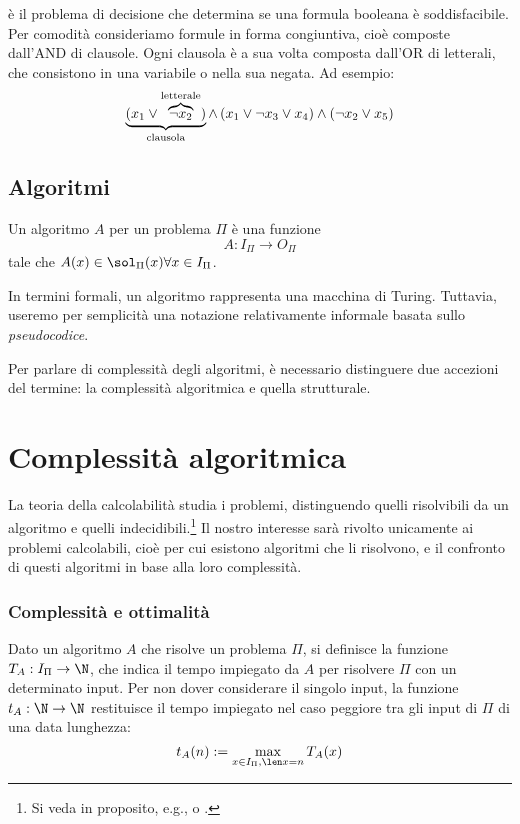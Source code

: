 \begin{examp}
	\Sat è il problema di decisione che determina se una formula booleana è soddisfacibile. Per comodità consideriamo formule in forma congiuntiva, cioè composte dall'AND di clausole. Ogni clausola è a sua volta composta dall'OR di letterali, che consistono in una variabile o nella sua negata. Ad esempio:
	\begin{equation*}
		\underbrace{(x_1\lor\overbrace{\lnot x_2}^{\text{letterale}})}_{\text{clausola}}\land\mkern 3mu (x_1\lor\lnot x_3\lor x_4)\land(\lnot x_2\lor x_5)
	\end{equation*}
\end{examp}



\subsection{Algoritmi}
Un algoritmo $A$ per un problema $\Pi$ è una funzione
\begin{equation*}
	A: I_{\Pi} \to O_{\Pi}
\end{equation*}
tale che $A(x)\in\sol_{\Pi}(x)\forall x\in I_\Pi$.

In termini formali, un algoritmo rappresenta una macchina di Turing.
Tuttavia, useremo per semplicità una notazione relativamente informale basata sullo \emph{pseudocodice}.

Per parlare di complessità degli algoritmi, è necessario distinguere due accezioni del termine: la complessità algoritmica e quella strutturale.



\section{Complessità algoritmica}
La teoria della calcolabilità studia i problemi, distinguendo quelli risolvibili da un algoritmo e quelli indecidibili.\footnote{Si veda in proposito, e.g., \cite{Hopcroft:79:introLFA} o \cite{Kfoury:82:programcomput}.} Il nostro interesse sarà rivolto unicamente ai problemi calcolabili, cioè per cui esistono algoritmi che li risolvono, e il confronto di questi algoritmi in base alla loro complessità.

\subsubsection{Complessità e ottimalità}
Dato un algoritmo $A$ che risolve un problema $\Pi$, si definisce la funzione $T_A:I_\Pi\to\N$, che indica il tempo impiegato da $A$ per risolvere $\Pi$ con un determinato input. Per non dover considerare il singolo input, la funzione $t_A:\N\to\N$ restituisce il tempo impiegato nel caso peggiore tra gli input di $\Pi$ di una data lunghezza:
\begin{equation*}
	t_A(n):=\max_{x\in I_\Pi,\len x=n} T_A(x)
\end{equation*}

